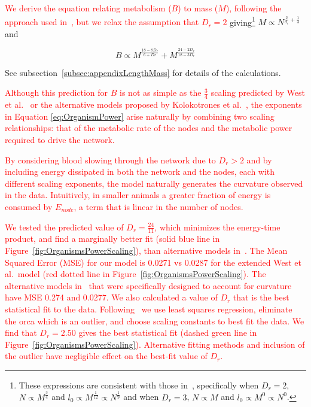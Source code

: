 \documentclass[12pt]{article}
\newcommand{\red}[1]{\textcolor{red}{#1}}
\begin{document}
\red{We derive the equation relating metabolism ($B$) to mass ($M$),
  following the approach used in~\cite{banavar10}, but
we relax the assumption that
$D_r=2$} giving\footnote{These expressions are consistent with those
in~\cite{banavar10}, specifically when $D_r=2$, $N\propto M^{\frac{3}{4}}$ and
$l_0 \propto M^{\frac{1}{12}}\propto N^{\frac{1}{9}}$ and when $D_r=3$, $N\propto M$ and $l_0\propto M^0 \propto N^0$.} $M \propto N^{\frac{2}{d_r} +
\frac{1}{3}}$ and

\begin{equation}
  \label{eq:OrganismPower}
  B \propto M^{\frac{18-8D_r}{6+Dr}} + M^{\frac{24-2D_r}{18-3D_r}} 
\end{equation}

\noindent See subsection~\ref{subsec:appendixLengthMass} for details of the calculations.

\red{Although this prediction for $B$ is not as simple as the $\frac{3}{4}$
scaling predicted by West et al.~\cite{west97} or the alternative models
proposed by Kolokotrones et al.~\cite{kolokotrones2010curvature}, the
exponents in Equation \ref{eq:OrganismPower} arise naturally by
combining two scaling relationships: that of the metabolic rate of the
nodes and the metabolic power required to drive the network.  }

\red{By considering blood slowing through the network due to $D_r > 2$ and by including energy dissipated in both
the network and the nodes, each with different scaling exponents, the model
naturally generates the curvature observed in the data.  Intuitively, in
smaller animals a greater fraction of energy is consumed by $E_{node}$, a term
that is linear in the number of nodes.  }

\red{We tested the predicted value of $D_r =
\frac{24}{11}$, which minimizes the energy-time product, and find a marginally better fit (solid blue line in Figure~\ref{fig:OrganismsPowerScaling}),  than alternative models in~\cite{kolokotrones2010curvature}.
The Mean Squared Error (MSE) for our model is 0.0271 vs 0.0287 for the extended West et al.\ model (red dotted line in Figure~\ref{fig:OrganismsPowerScaling}). The alternative models in~\cite{kolokotrones2010curvature} that were specifically designed to account for curvature have MSE 0.274 and 0.0277. We also calculated a value of $D_r$ that is the best statistical fit to the data. Following~\cite{kolokotrones2010curvature} we use least squares regression, eliminate the orca which is an outlier, and choose scaling constants to best fit the data. We find that $D_r = 2.50$ gives the best statistical fit (dashed green line in Figure~\ref{fig:OrganismsPowerScaling}). Alternative fitting methods and inclusion of the outlier have negligible effect on the best-fit value of $D_r$.}
\end{document}
